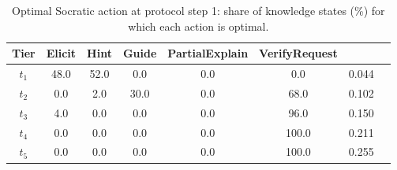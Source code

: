 \begin{table}[H]
\caption{Optimal Socratic action at protocol step 1: share of knowledge states (\%) for which each action is optimal.\label{tab:socratic}}
\small
\begin{tabularx}{\textwidth}{Cccccccc}
\toprule
\textbf{Tier} & \textbf{Elicit} & \textbf{Hint} & \textbf{Guide} & \textbf{PartialExplain} & \textbf{VerifyRequest} &  \\
\midrule
$t_1$ & 48.0 & 52.0 & 0.0 & 0.0 & 0.0 & 0.044 \\
$t_2$ & 0.0 & 2.0 & 30.0 & 0.0 & 68.0 & 0.102 \\
$t_3$ & 4.0 & 0.0 & 0.0 & 0.0 & 96.0 & 0.150 \\
$t_4$ & 0.0 & 0.0 & 0.0 & 0.0 & 100.0 & 0.211 \\
$t_5$ & 0.0 & 0.0 & 0.0 & 0.0 & 100.0 & 0.255 \\
\bottomrule
\end{tabularx}
\end{table}
